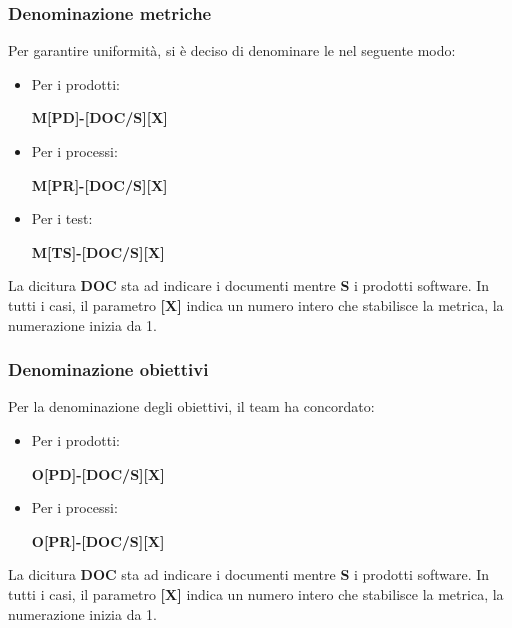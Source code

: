 \subsubsection{Denominazione metriche}
Per garantire uniformità, si è deciso di denominare le  nel seguente modo:
\begin{itemize}
    \item Per i prodotti:
          \begin{center}
              \textbf{M[PD]-[DOC/S][X]}
          \end{center}
    \item Per i processi:
          \begin{center}
              \textbf{M[PR]-[DOC/S][X]}
          \end{center}
    \item Per i test:
          \begin{center}
              \textbf{M[TS]-[DOC/S][X]}
          \end{center}
\end{itemize}
La dicitura \textbf{DOC} sta ad indicare i documenti mentre \textbf{S} i prodotti software.
In tutti i casi, il parametro \textbf{[X]} indica un numero intero che stabilisce la metrica, la numerazione inizia da 1.

\subsubsection{Denominazione obiettivi}
Per la denominazione degli obiettivi, il team ha concordato:
\begin{itemize}
    \item Per i prodotti:
          \begin{center}
              \textbf{O[PD]-[DOC/S][X]}
          \end{center}
    \item Per i processi:
          \begin{center}
              \textbf{O[PR]-[DOC/S][X]}
          \end{center}
\end{itemize}
La dicitura \textbf{DOC} sta ad indicare i documenti mentre \textbf{S} i prodotti software.
In tutti i casi, il parametro \textbf{[X]} indica un numero intero che stabilisce la metrica, la numerazione inizia da 1.

